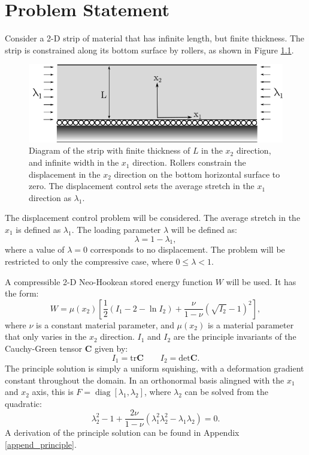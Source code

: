 \documentclass[11pt]{report}
\DeclareMathOperator{\diag}{diag}
\begin{document}
\tableofcontents

\chapter{Problem Statement}
Consider a 2-D strip of material that has infinite length, but finite thickness. The strip is constrained along its bottom surface by rollers, as shown in Figure \ref{fig:stripFig}.
\begin{figure}[h]
	\begin{center}
		\includegraphics[scale=0.7]{compressed_strip_drawing}
	\end{center}
	\captionsetup{format=hang}
	\caption{Diagram of the strip with finite thickness of $L$ in the $x_2$ direction, and infinite width in the $x_1$ direction. Rollers constrain the displacement in the $x_2$ direction on the bottom horizontal surface to zero. The displacement control sets the average stretch in the $x_1$ direction as $\lambda_1$.}
	\label{fig:stripFig}
\end{figure}

The displacement control problem will be considered. The average stretch in the $x_1$ is defined as $\lambda_1$. The loading parameter $\lambda$ will be defined as:
\begin{equation}
\lambda = 1 - \lambda_1,
\end{equation}
where a value of $\lambda = 0$ corresponds to no displacement. The problem will be restricted to only the compressive case, where $ 0 \leq \lambda < 1 $.

A compressible 2-D Neo-Hookean stored energy function $W$ will be used. It has the form:
\begin{equation} \label{eq:energyFunction}
W=\mu(x_2)\left[\frac{1}{2}(I_1 - 2- \ln{I_2}) + \frac{\nu}{1-\nu}(\sqrt{I_2} - 1)^2\right],
\end{equation}
where $\nu$ is a constant material parameter, and $\mu(x_2)$ is a material parameter that only varies in the $x_2$ direction. $I_1$ and $I_2$ are the principle invariants of the Cauchy-Green tensor $\mathbf{C}$ given by:
\begin{equation} \label{eq:I_functions}
I_1 = \mathrm{tr}\mathbf{C} \qquad I_2 = \mathrm{det} \mathbf{C}.
\end{equation}
The principle solution is simply a uniform squishing, with a deformation gradient constant throughout the domain. In an orthonormal basis alingned with the $x_1$ and $x_2$ axis, this is $F = \diag[\lambda_1, \lambda_2]$, where $\lambda_2$ can be solved from the quadratic:
\begin{equation}
\lambda_2^2 - 1 + \frac{2\nu}{1 - \nu}(\lambda_1^2 \lambda_2^2 - \lambda_1\lambda_2) = 0.
\end{equation}
A derivation of the principle solution can be found in Appendix \ref{append_principle}.
\end{document}
